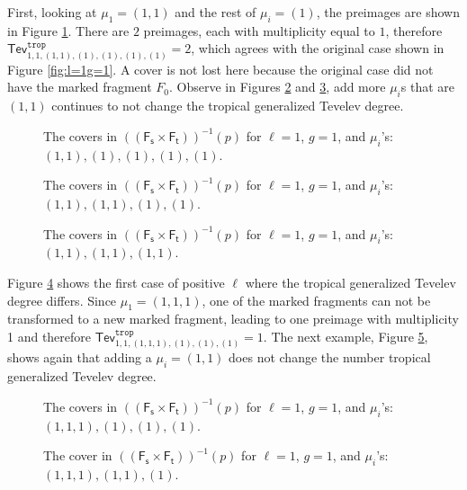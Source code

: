 \documentclass[11pt,reqno]{amsart}
\newcommand{\inputTikZ}[2]{%
     \resizebox{#1}{!}{}}
\theoremstyle{definition}
\newcommand\trop{{\mathtt{trop}}}
\newcommand{\Ft}{\mathsf{F_t}}
\newcommand{\Fs}{\mathsf{F_s}}
\newcommand{\Tev}{{\mathsf{Tev}}}
\begin{document}
First, looking at $\mu_1=(1,1)$ and the rest of $\mu_i=(1)$, the preimages are shown in Figure \ref{fig:ell=1,g=1,(1,1)}. There are $2$ preimages, each with multiplicity equal to $1$, therefore $\Tev_{1,1,(1,1),(1),(1),(1),(1)}^\trop=2$, which agrees with the original case shown in Figure \ref{fig:l=1g=1}. A cover is not lost here because the original case did not have the marked fragment $F_0$. Observe in Figures \ref{fig:ell=1,g=1,(1,1)(1,1)} and \ref{fig:ell=1,g=1,(1,1)(1,1)(1,1)}, add more $\mu_i$s that are $(1,1)$ continues to not change the tropical generalized Tevelev degree. 

    \begin{figure}[tb]
        \centering
        \inputTikZ{.8\textwidth}{Figures/ell=1,g=1,_1,1_}
        \caption{The covers in $((\Fs\times\Ft))^{-1}(p)$ for $\ell=1$, $g=1$, and $\mu_i$'s: $(1,1),(1),(1),(1),(1).$}
        \label{fig:ell=1,g=1,(1,1)}
    \end{figure}
    \begin{figure}[tb]
        \centering
        \inputTikZ{.8\textwidth}{Figures/ell=1,g=1,_1,1__1,1_}
        \caption{The covers in $((\Fs\times\Ft))^{-1}(p)$ for $\ell=1$, $g=1$, and $\mu_i$'s: $(1,1),(1,1),(1),(1).$}
        \label{fig:ell=1,g=1,(1,1)(1,1)}
    \end{figure}
        \begin{figure}[tb]
        \centering
        \inputTikZ{.8\textwidth}{Figures/ell=1,g=1,_1,1__1,1__1,1_}
        \caption{The covers in $((\Fs\times\Ft))^{-1}(p)$ for $\ell=1$, $g=1$, and $\mu_i$'s: $(1,1),(1,1),(1,1).$}
        \label{fig:ell=1,g=1,(1,1)(1,1)(1,1)}
    \end{figure}

Figure \ref{fig:ell=1,g=1,(1,1,1)} shows the first case of positive $\ell$ where the tropical generalized Tevelev degree differs. Since $\mu_1=(1,1,1)$, one of the marked fragments can not be transformed to a new marked fragment, leading to one preimage with multiplicity 1 and therefore $\Tev_{1,1,(1,1,1),(1),(1),(1)}^\trop=1$. The next example, Figure \ref{fig:ell=1,g=1,(1,1,1)(1,1)}, shows again that adding a $\mu_i=(1,1)$ does not change the number tropical generalized Tevelev degree. 
    
    \begin{figure}[tb]
        \centering
        \inputTikZ{.4\textwidth}{Figures/ell=1,g=1,_1,1,1_}
        \caption{The covers in $((\Fs\times\Ft))^{-1}(p)$ for $\ell=1$, $g=1$, and $\mu_i$'s: $(1,1,1),(1),(1),(1).$}
        \label{fig:ell=1,g=1,(1,1,1)}
    \end{figure}
        \begin{figure}[tb]
        \centering
        \inputTikZ{.4\textwidth}{Figures/ell=1,g=1,_1,1,1__1,1_}
        \caption{The cover in $((\Fs\times\Ft))^{-1}(p)$ for $\ell=1$, $g=1$, and $\mu_i$'s: $(1,1,1),(1,1),(1).$}
        \label{fig:ell=1,g=1,(1,1,1)(1,1)}
    \end{figure}
\end{document}
